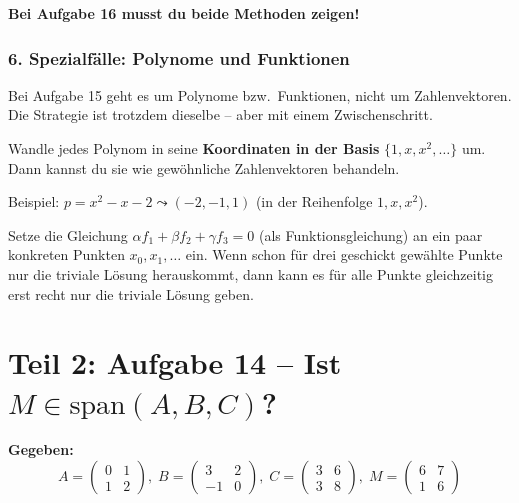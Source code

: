 \documentclass[a4paper,12pt]{article}
\begin{document}
\textbf{Bei Aufgabe 16 musst du beide Methoden zeigen!}

\section*{6. Spezialf\"alle: Polynome und Funktionen}

Bei Aufgabe 15 geht es um Polynome bzw.\ Funktionen, nicht um Zahlenvektoren. Die Strategie ist trotzdem dieselbe -- aber mit einem Zwischenschritt.

\begin{merkbox}[title={Polynome ($\mathbb{R}_n[x]$)}]
Wandle jedes Polynom in seine \textbf{Koordinaten in der Basis} $\{1, x, x^2, \ldots\}$ um. Dann kannst du sie wie gew\"ohnliche Zahlenvektoren behandeln.

\medskip
Beispiel: $p = x^2 - x - 2 \leadsto (-2, -1, 1)$ \quad (in der Reihenfolge $1, x, x^2$).
\end{merkbox}

\begin{merkbox}[title={Funktionen ($\text{FUNC}(\mathbb{R})$)}]
Setze die Gleichung $\alpha f_1 + \beta f_2 + \gamma f_3 = 0$ (als Funktionsgleichung) an ein paar konkreten Punkten $x_0, x_1, \ldots$ ein. Wenn schon f\"ur drei geschickt gew\"ahlte Punkte nur die triviale L\"osung herauskommt, dann kann es f\"ur alle Punkte gleichzeitig erst recht nur die triviale L\"osung geben.
\end{merkbox}

\newpage

\part*{Teil 2: Aufgabe 14 -- Ist $M \in \text{span}(A,B,C)$?}

\textbf{Gegeben:}
\[
A = \begin{pmatrix} 0 & 1 \\ 1 & 2 \end{pmatrix},\;
B = \begin{pmatrix} 3 & 2 \\ -1 & 0 \end{pmatrix},\;
C = \begin{pmatrix} 3 & 6 \\ 3 & 8 \end{pmatrix},\;
M = \begin{pmatrix} 6 & 7 \\ 1 & 6 \end{pmatrix}
\]
\end{document}
